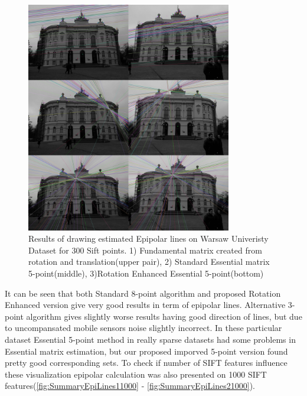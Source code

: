 \begin{figure}[ht!]
    \centering
    \includegraphics[width=0.8\textwidth]{summary2Sift300}
    \caption{Results of drawing estimated Epipolar lines on Warsaw Univeristy Dataset for 300 Sift points. 1) Fundamental matrix created from rotation and translation(upper pair), 2) Standard Essential matrix 5-point(middle), 3)Rotation Enhanced Essential 5-point(bottom) }
    \label{fig:SummaryEpiLines2300}
\end{figure}
It can be seen that both Standard 8-point algorithm and proposed Rotation Enhanced version give very good results in term of epipolar lines. Alternative 3-point algorithm gives slightly worse results having good direction of lines, but due to uncompansated mobile sensors noise slightly incorrect. In these particular dataset Essential 5-point method in really sparse datasets had some problems in Essential matrix estimation, but our proposed imporved 5-point version found pretty good corresponding sets. To check if number of SIFT features influence these visualization epipolar calculation was also presented on 1000 SIFT features(\ref{fig:SummaryEpiLines11000} - \ref{fig:SummaryEpiLines21000}). 
